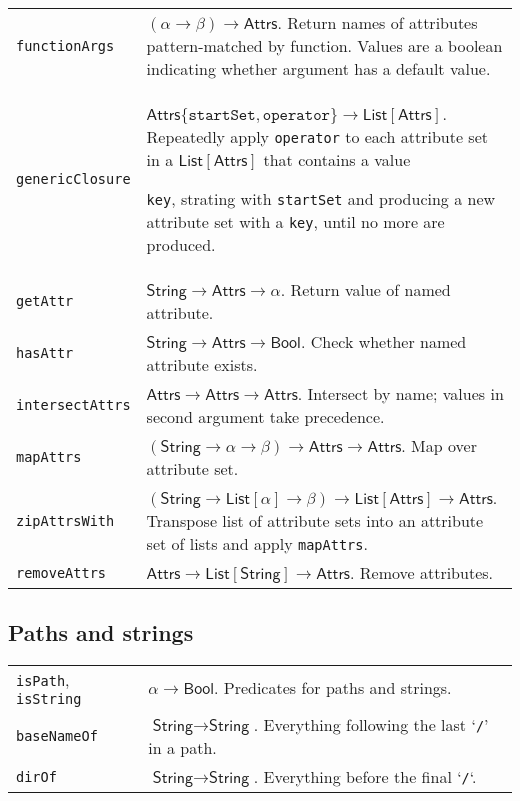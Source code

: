 \documentclass[9pt, a4paper, landscape]{extarticle}
\newcommand{\cmd}[1]{\texttt{#1}}
\newcommand{\str}{\textsf{String}}
\newcommand{\lst}{\textsf{List}}
\newcommand{\ats}{\textsf{Attrs}}
\newcommand{\bln}{\textsf{Bool}}
\begin{document}
\begin{multicols*}{3}
\begin{tabularx}{\columnwidth}{@{}l>{\raggedright\arraybackslash}X@{}}
  \cmd{functionArgs} & $(\alpha\to\beta)\to\ats$. Return names of attributes
  pattern-matched by function. Values are a boolean indicating whether
  argument has a default value. \\

  \cmd{genericClosure} & $\ats\{\cmd{startSet},
  \cmd{operator}\}\to\lst[\ats]$. Repeatedly apply \cmd{operator} to
  each attribute set in a $\lst[\ats]$ that contains a value

  \cmd{key}, strating with \cmd{startSet} and producing a new
  attribute set with a \cmd{key}, until no more are produced. \\

  \cmd{getAttr} & $\str\to\ats\to\alpha$. Return value of named attribute. \\

  \cmd{hasAttr} & $\str\to\ats\to\bln$. Check whether named attribute
  exists. \\

  \cmd{intersectAttrs} & $\ats\to\ats\to\ats$. Intersect by name; values
  in second argument take precedence. \\

  \cmd{mapAttrs} & $(\str\to\alpha\to\beta)\to\ats\to\ats$. Map over attribute set. \\

  \cmd{zipAttrsWith} & $(\str\to\lst[\alpha]\to\beta)\to\lst[\ats]\to\ats$. Transpose
  list of attribute sets into an attribute set of lists and apply
  \cmd{mapAttrs}.\\

  \cmd{removeAttrs} & $\ats\to\lst[\str]\to\ats$. Remove attributes. \\


\end{tabularx}

\subsection*{Paths and strings}
\begin{tabularx}{\columnwidth}{@{}l>{\raggedright\arraybackslash}X@{}}

  \cmd{isPath}, \cmd{isString} & $\alpha\to\bln$. Predicates for paths and
  strings. \\

  \cmd{baseNameOf} & $\str\to\str$. Everything following the last
  `\cmd{/}' in a path. \\

  \cmd{dirOf} & $\str\to\str$. Everything before the final `\cmd{/}`. \\
  

\end{tabularx}
\end{multicols*}
\end{document}
